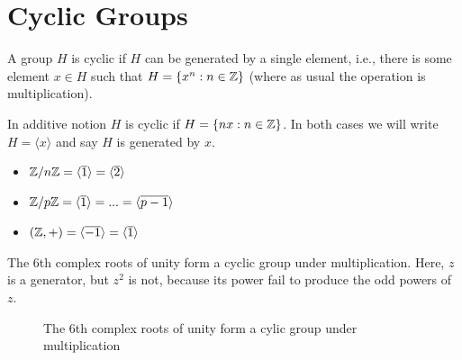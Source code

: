 \section{Cyclic Groups}
\begin{definition}
    A group $H$ is cyclic if $H$ can be generated by a single element, i.e., there is some element $x \in H$ such that $H = \{x^n : n \in \mathbb{Z}\}$ (where as usual the operation is multiplication).  
\end{definition}
In additive notion $H$ is cyclic if $H = \{nx : n \in \mathbb{Z}\}$. In both cases we will write $H = \langle x \rangle$ and say $H$ is generated by $x$.
\begin{eg}
    \begin{itemize}
        \item $\mathbb{Z}/n\mathbb{Z} = \langle \overline{1} \rangle = \langle \overline{2} \rangle$
        \item $\mathbb{Z}/ p \mathbb{Z} = \langle \overline{1} \rangle = ... = \langle \overline{p-1} \rangle$
        \item $(\mathbb{Z}, +) = \langle \overline{-1}\rangle = \langle \overline{1}\rangle$ 
    \end{itemize}
\end{eg}
\begin{eg}
    The 6th complex roots of unity form a cyclic group under multiplication. Here, $z$ is a generator, but $z^2$ is not, because its power fail to produce the odd powers of $z$.   
    \begin{figure}[H]
        \centering
        \caption{The 6th complex roots of unity form a cylic group under multiplication}
        \label{fig:6th-root-of-unity}
    \end{figure}
\end{eg}
